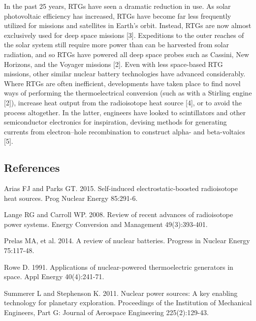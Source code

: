 \documentclass{report}
\newcommand{\tab}{\-\hspace{1cm}}
\begin{document}
\begin{multicols}{2}
\tab In the past 25 years, RTGs have seen a dramatic reduction in use. As solar photovoltaic efficiency has increased, RTGs have become far less frequently utilized for missions and satellites in Earth's orbit. Instead, RTGs are now almost exclusively used for deep space missions [3].  Expeditions to the outer reaches of the solar system still require more power than can be harvested from solar radiation, and so RTGs have powered all deep space probes such as Cassini, New Horizons, and the Voyager missions [2]. Even with less space-based RTG missions, other similar nuclear battery technologies have advanced considerably. Where RTGs are often inefficient, developments have taken place to find novel ways of performing the thermoelectrical conversion (such as with a Stirling engine [2]), increase heat output from the radioisotope heat source [4], or to avoid the process altogether. In the latter, engineers have looked to scintillators and other semiconductor electronics for inspiration, devising methods for generating currents from electron--hole recombination to construct alpha- and beta-voltaics [5].

\end{multicols}
\subsection*{References}
Arias FJ and Parks GT. 2015. Self-induced electrostatic-boosted radioisotope heat sources. Prog Nuclear Energy 85:291-6.

Lange RG and Carroll WP. 2008. Review of recent advances of radioisotope power systems. Energy Conversion and Management 49(3):393-401.

Prelas MA, et al. 2014. A review of nuclear batteries. Progress in Nuclear Energy 75:117-48.

Rowe D. 1991. Applications of nuclear-powered thermoelectric generators in space. Appl Energy 40(4):241-71.

Summerer L and Stephenson K. 2011. Nuclear power sources: A key enabling technology for planetary exploration. Proceedings of the Institution of Mechanical Engineers, Part G: Journal of Aerospace Engineering 225(2):129-43.
	
\end{document}

